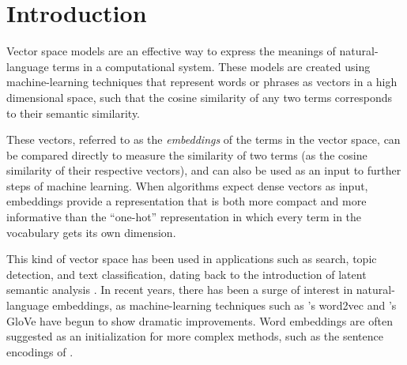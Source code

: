 \documentclass[11pt,letterpaper]{article}
\title{\thetitle}
\author{Robert Speer\\
    Luminoso Technologies, Inc.\\
    675 Massachusetts Ave.\\
    Cambridge, MA 02139\\
    \texttt{rspeer@luminoso.com}
\And
    Joshua Chin\\
    Union College\\
    807 Union St.\\
    Schenectady, NY 12308\\
    \texttt{joshuarchin@gmail.com}
}
\date{}
\begin{document}
\maketitle
\begin{abstract}

A currently successful approach to computational semantics is to represent
words as embeddings in a machine-learned vector space. We
present an ensemble method that combines embeddings produced by GloVe
\cite{pennington2014glove} and word2vec \cite{mikolov2013word2vec} with
structured knowledge from the semantic network ConceptNet 5
\cite{speer2012conceptnet} and PPDB \cite{ganitkevitch2013ppdb}, merging their
information into a common representation with a large, multilingual vocabulary.
The embeddings it produces achieve state-of-the-art performance on many word
similarity evaluations. Its score of $\rho = \scoreRW{}$ on an evaluation of
rare words \cite{luong2013rw} is 16\% higher than the previous best known
system.

\end{abstract}

\section{Introduction}

Vector space models are an effective way to express the meanings of
natural-language terms in a computational system. These models are created
using machine-learning techniques that represent words or phrases as
vectors in a high dimensional space, such that the cosine similarity of any two
terms corresponds to their semantic similarity.

These vectors, referred to as
the {\em embeddings} of the terms in the vector space, can be compared directly
to measure the similarity of two terms (as the cosine similarity of their
respective vectors), and can also be used as an input to further steps of
machine learning. When algorithms expect dense vectors as input, embeddings
provide a representation that is both more compact and more informative than the
``one-hot'' representation in which every term in the vocabulary gets its own
dimension.

This kind of vector space has been used in applications such as search, topic
detection, and text classification, dating back to the introduction of latent
semantic analysis \cite{deerwester1990indexing}.  In recent years, there has
been a surge of interest in natural-language embeddings, as machine-learning
techniques such as 's word2vec and
's GloVe have begun to show dramatic improvements.
Word embeddings are often suggested as an initialization for more complex
methods, such as the sentence encodings of .
\end{document}
